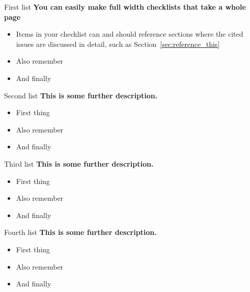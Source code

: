 \documentclass[9pt,bestpractices]{livecoms}
\begin{document}
\begin{Checklists*}[p!]

\begin{checklist}{First list}
\textbf{You can easily make full width checklists that take a whole page}
\begin{itemize}
\item Items in your checklist can and should reference sections where the cited issues are discussed in detail, such as Section~\ref{sec:reference_this}
\item Also remember
\item And finally
\end{itemize}
\end{checklist}

\begin{checklist}{Second list}
\textbf{This is some further description.}
\begin{itemize}
\item First thing
\item Also remember
\item And finally
\end{itemize}
\end{checklist}

\begin{checklist}{Third list}
\textbf{This is some further description.}
\begin{itemize}
\item First thing
\item Also remember
\item And finally
\end{itemize}
\end{checklist}

\begin{checklist}{Fourth list}
\textbf{This is some further description.}
\begin{itemize}
\item First thing
\item Also remember
\item And finally
\end{itemize}
\end{checklist}


\end{Checklists*}
\end{document}
